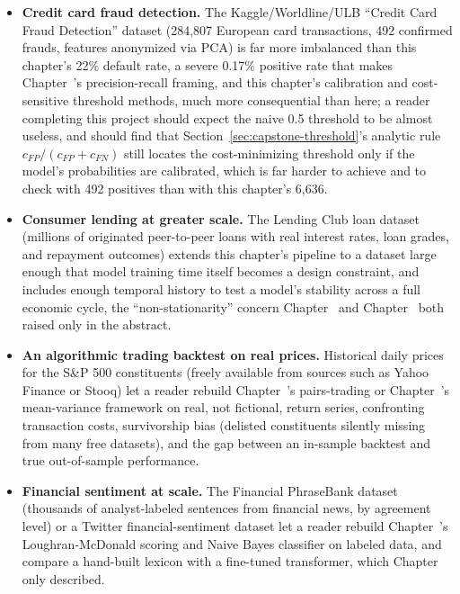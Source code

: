 \documentclass[../ai_in_finance]{subfiles}
\begin{document}
\begin{itemize}
    \item \textbf{Credit card fraud detection.} The Kaggle/Worldline/ULB ``Credit Card Fraud Detection'' dataset (284,807 European card transactions, 492 confirmed frauds, features anonymized via PCA) is far more imbalanced than this chapter's 22\% default rate, a severe 0.17\% positive rate that makes Chapter~'s precision-recall framing, and this chapter's calibration and cost-sensitive threshold methods, much more consequential than here; a reader completing this project should expect the naive 0.5 threshold to be almost useless, and should find that Section~\ref{sec:capstone-threshold}'s analytic rule $c_{FP}/(c_{FP}+c_{FN})$ still locates the cost-minimizing threshold only if the model's probabilities are calibrated, which is far harder to achieve and to check with 492 positives than with this chapter's 6,636.
    \item \textbf{Consumer lending at greater scale.} The Lending Club loan dataset (millions of originated peer-to-peer loans with real interest rates, loan grades, and repayment outcomes) extends this chapter's pipeline to a dataset large enough that model training time itself becomes a design constraint, and includes enough temporal history to test a model's stability across a full economic cycle, the ``non-stationarity'' concern Chapter~ and Chapter~ both raised only in the abstract.
    \item \textbf{An algorithmic trading backtest on real prices.} Historical daily prices for the S\&P 500 constituents (freely available from sources such as Yahoo Finance or Stooq) let a reader rebuild Chapter~'s pairs-trading or Chapter~'s mean-variance framework on real, not fictional, return series, confronting transaction costs, survivorship bias (delisted constituents silently missing from many free datasets), and the gap between an in-sample backtest and true out-of-sample performance.
    \item \textbf{Financial sentiment at scale.} The Financial PhraseBank dataset (thousands of analyst-labeled sentences from financial news, by agreement level) or a Twitter financial-sentiment dataset let a reader rebuild Chapter~'s Loughran-McDonald scoring and Naive Bayes classifier on labeled data, and compare a hand-built lexicon with a fine-tuned transformer, which Chapter~ only described.

\end{itemize}
\end{document}
